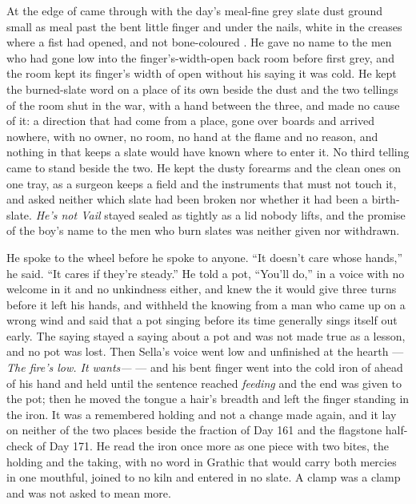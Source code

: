 At the edge of   came through with the day's meal-fine grey slate dust ground small as meal past the bent little finger and under the nails, white in the creases where a fist had opened, and not bone-coloured . He gave no name to the men who had gone low into the finger's-width-open back room before first grey, and the room kept its finger's width of open without his saying it was cold. He kept the burned-slate word on a place of its own beside the dust and the two tellings of the room shut in the war, with a hand between the three, and made no cause of it: a direction that had come from a place, gone over boards and arrived nowhere, with no owner, no room, no hand at the flame and no reason, and nothing in  that keeps a slate would have known where to enter it. No third telling came to stand beside the two. He kept the dusty forearms and the clean ones on one tray, as a surgeon keeps a field and the instruments that must not touch it, and asked neither which slate had been broken nor whether it had been a birth-slate. \emph{He's not Vail} stayed sealed as tightly as a lid nobody lifts, and the promise of the boy's name to the men who burn slates was neither given nor withdrawn.

He spoke to the wheel before he spoke to anyone. “It doesn't care whose hands,” he said. “It cares if they're steady.” He told a pot, “You'll do,” in a voice with no welcome in it and no unkindness either, and knew the  it would give three turns before it left his hands, and withheld the knowing from a man who came up on a wrong wind and said that a pot singing before its time generally sings itself out early. The saying stayed a saying about a pot and was not made true as a lesson, and no pot was lost. Then Sella's voice went low and unfinished at the hearth --- \emph{The fire's low. It wants---} --- and his bent finger went into the cold iron of  ahead of his hand and held until the sentence reached \emph{feeding} and the end was given to the pot; then he moved the tongue a hair's breadth and left the finger standing in the iron. It was a remembered holding and not a change made again, and it lay on neither of the two places beside the fraction of Day 161 and the flagstone half-check of Day 171. He read the iron once more as one piece with two bites, the holding and the taking, with no word in Grathic that would carry both mercies in one mouthful, joined to no kiln and entered in no slate. A clamp was a clamp and was not asked to mean more.

